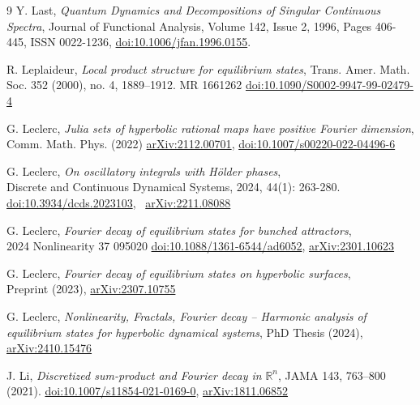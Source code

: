 \documentclass[a4paper]{article}
\theoremstyle{definition}
\begin{document}
\begin{thebibliography}{9}
    {Y. Last},
    \emph{Quantum Dynamics and Decompositions of Singular Continuous Spectra},
    Journal of Functional Analysis,
    Volume 142, Issue 2,
    1996,
    Pages 406-445,
    ISSN 0022-1236,
    \href{https://doi.org/10.1006/jfan.1996.0155}{doi:10.1006/jfan.1996.0155}.


    {R. Leplaideur},
    \emph{Local product structure for equilibrium states},
    Trans. Amer. Math. Soc. 352 (2000), no. 4, 1889–1912. MR 1661262 
    \href{https://doi.org/10.1090/S0002-9947-99-02479-4}{doi:10.1090/S0002-9947-99-02479-4}
    
    {G. Leclerc},
    \emph{Julia sets of hyperbolic rational maps have positive Fourier dimension}, \\ Comm. Math. Phys. (2022) \href{https://arxiv.org/abs/2112.00701?context=math}{	arXiv:2112.00701},  \href{https://doi.org/10.1007/s00220-022-04496-6}{doi:10.1007/s00220-022-04496-6}


    {G. Leclerc},
    \emph{On oscillatory integrals with Hölder phases}, \\ 
    Discrete and Continuous Dynamical Systems, 2024, 44(1): 263-280. \href{https://www.aimsciences.org/article/doi/10.3934/dcds.2023103}{doi:10.3934/dcds.2023103}, \ 
    \href{https://arxiv.org/abs/2211.08088}{arXiv:2211.08088}


    {G. Leclerc},
    \emph{Fourier decay of equilibrium states for bunched attractors}, \\ 2024 Nonlinearity 37 095020
    \href{https://iopscience.iop.org/article/10.1088/1361-6544/ad6052}{doi:10.1088/1361-6544/ad6052}, 
    \href{https://arxiv.org/abs/2301.10623}{arXiv:2301.10623} 


    {G. Leclerc},
    \emph{Fourier decay of equilibrium states on hyperbolic surfaces}, \\
    Preprint (2023), \href{https://arxiv.org/abs/2307.10755}{arXiv:2307.10755}



    {G. Leclerc},
    \emph{Nonlinearity, Fractals, Fourier decay -- Harmonic analysis of equilibrium states for hyperbolic dynamical systems}, 
    PhD Thesis (2024), \href{https://arxiv.org/abs/2410.15476}{arXiv:2410.15476}


     {J. Li}, 
     \emph{Discretized sum-product and Fourier decay in }$\mathbb{R}^n$,
     JAMA 143, 763–800 (2021). \newline \href{https://doi.org/10.1007/s11854-021-0169-0}{doi:10.1007/s11854-021-0169-0},  \href{https://arxiv.org/abs/1811.06852v2}{arXiv:1811.06852} 


\end{thebibliography}
\end{document}

